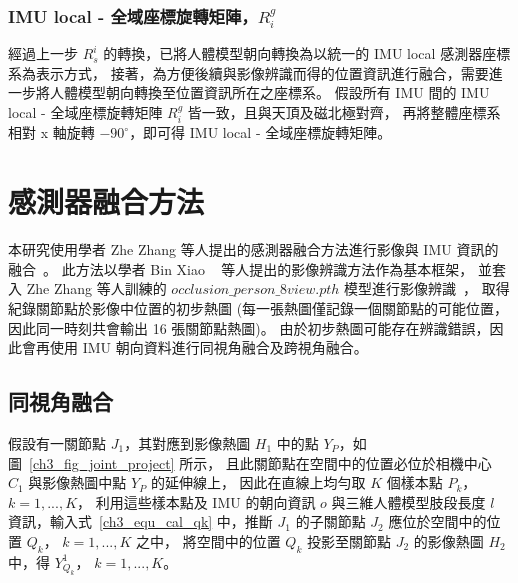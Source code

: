 \subsubsection{IMU local - 全域座標旋轉矩陣，$R^g_i$}
經過上一步 $R^i_s$ 的轉換，已將人體模型朝向轉換為以統一的 IMU local 感測器座標系為表示方式，
接著，為方便後續與影像辨識而得的位置資訊進行融合，需要進一步將人體模型朝向轉換至位置資訊所在之座標系。
假設所有 IMU 間的 IMU local - 全域座標旋轉矩陣 $R^g_i$ 皆一致，且與天頂及磁北極對齊，
再將整體座標系相對 x 軸旋轉 $-90^{\circ}$，即可得 IMU local - 全域座標旋轉矩陣。

\section{感測器融合方法}
本研究使用學者 Zhe Zhang 等人提出的感測器融合方法進行影像與 IMU 資訊的融合~\cite{Zhang_2020_CVPR}。
此方法以學者 Bin Xiao ~\cite{Xiao_2018_ECCV} 等人提出的影像辨識方法作為基本框架，
並套入 Zhe Zhang 等人訓練的 $occlusion\_person\_8view.pth$ 模型進行影像辨識~\cite{zhang2020adafuse}，
取得紀錄關節點於影像中位置的初步熱圖 (每一張熱圖僅記錄一個關節點的可能位置，因此同一時刻共會輸出 16 張關節點熱圖)。
由於初步熱圖可能存在辨識錯誤，因此會再使用 IMU 朝向資料進行同視角融合及跨視角融合。

\subsection{同視角融合}
假設有一關節點 $J_1$，其對應到影像熱圖 $H_1$ 中的點 $Y_P$，如圖~\ref{ch3_fig_joint_project} 所示，
且此關節點在空間中的位置必位於相機中心 $C_1$ 與影像熱圖中點 $Y_P$ 的延伸線上，
因此在直線上均勻取 $K$ 個樣本點 $P_k$， $k = 1, ..., K$，
利用這些樣本點及 IMU 的朝向資訊 $o$ 與三維人體模型肢段長度 $l$ 資訊，輸入式~\ref{ch3_equ_cal_qk} 中，推斷 $J_1$ 的子關節點 $J_2$ 應位於空間中的位置 $Q_k$， $k = 1, ..., K$ 之中，
將空間中的位置 $Q_k$ 投影至關節點 $J_2$ 的影像熱圖 $H_2$ 中，得 $Y^1_{Q_k}$， $k = 1, ..., K$。

